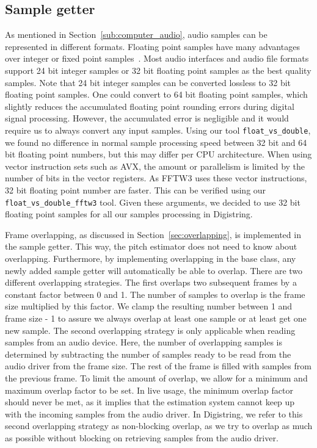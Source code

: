 \documentclass[a4paper,10pt,twocolumn]{article}
\begin{document}
\subsection{Sample getter}  \label{sub:samplegetter}
As mentioned in Section~\ref{sub:computer_audio}, audio samples can be represented in different formats. Floating point samples have many advantages over integer or fixed point samples~\cite{dspfloat}. Most audio interfaces and audio file formats support 24 bit integer samples or 32 bit floating point samples as the best quality samples. Note that 24 bit integer samples can be converted lossless to 32 bit floating point samples. One could convert to 64 bit floating point samples, which slightly reduces the accumulated floating point rounding errors during digital signal processing. However, the accumulated error is negligible and it would require us to always convert any input samples. Using our tool \texttt{float\_vs\_double}, we found no difference in normal sample processing speed between 32 bit and 64 bit floating point numbers, but this may differ per CPU architecture. When using vector instruction sets such as AVX, the amount or parallelism is limited by the number of bits in the vector registers. As FFTW3 uses these vector instructions, 32 bit floating point number are faster. This can be verified using our \texttt{float\_vs\_double\_fftw3} tool. Given these arguments, we decided to use 32 bit floating point samples for all our samples processing in Digistring.

Frame overlapping, as discussed in Section~\ref{sec:overlapping}, is implemented in the sample getter. This way, the pitch estimator does not need to know about overlapping. Furthermore, by implementing overlapping in the base class, any newly added sample getter will automatically be able to overlap. There are two different overlapping strategies. The first overlaps two subsequent frames by a constant factor between 0 and 1. The number of samples to overlap is the frame size multiplied by this factor. We clamp the resulting number between 1 and frame size - 1 to assure we always overlap at least one sample or at least get one new sample. The second overlapping strategy is only applicable when reading samples from an audio device. Here, the number of overlapping samples is determined by subtracting the number of samples ready to be read from the audio driver from the frame size. The rest of the frame is filled with samples from the previous frame. To limit the amount of overlap, we allow for a minimum and maximum overlap factor to be set. In live usage, the minimum overlap factor should never be met, as it implies that the estimation system cannot keep up with the incoming samples from the audio driver. In Digistring, we refer to this second overlapping strategy as non-blocking overlap, as we try to overlap as much as possible without blocking on retrieving samples from the audio driver.%
\end{document}
